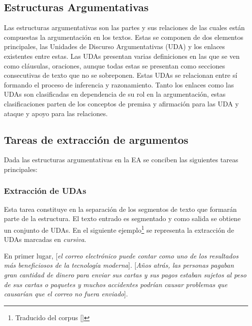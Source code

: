 \subsection{Estructuras Argumentativas}


Las estructuras argumentativas son las partes y sus relaciones de las cuales están compuestas la argumentación en los textos.
Estas se componen de dos elementos principales, las Unidades de Discurso Argumentativas (UDA) y los enlaces
existentes entre estas.
Las UDAs presentan varias definiciones en las que se ven como cláusulas, oraciones, aunque
todas estas se presentan como secciones consecutivas de texto que no se sobreponen. Estas UDAs se relacionan entre 
sí formando el proceso de inferencia y razonamiento.
Tanto los enlaces como las UDAs son clasificadas en dependencia de su rol en la argumentación, estas clasificaciones 
parten de los conceptos de premisa y afirmación para las UDA y ataque y apoyo para las relaciones. 

\subsection{Tareas de extracción de argumentos}

Dada las estructuras argumentativas en la EA se conciben las siguientes tareas principales:

\subsubsection{Extracción de UDAs}

Esta tarea constituye en la separación de los segmentos de texto que formarán parte de la estructura.
El texto entrado es segmentado y como salida se obtiene un conjunto de UDAs. En el siguiente 
ejemplo\footnote{Traducido del corpus [\cite{stab2017parsing}]} se representa 
la extracción de UDAs marcadas en \emph{cursiva}.

\begin{adjustwidth}{25pt}{25pt}
    En primer lugar, [\emph{el correo electrónico puede contar como uno de los resultados
    más beneficiosos de la tecnología moderna}]. [\emph{Años atrás, las personas pagaban gran cantidad de dinero para 
    enviar sus cartas y sus pagos estaban sujetos al peso de sus cartas o paquetes y muchos accidentes podrían 
    causar problemas que causarían que el correo no fuera enviado}].
\end{adjustwidth}

